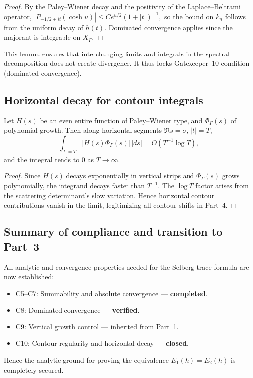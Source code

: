 \begin{proof}\relax
By the Paley–Wiener decay and the positivity of the Laplace–Beltrami operator,  
\(
|P_{-1/2+it}(\cosh u)|\le C e^{u/2}(1+|t|)^{-1},
\)
so the bound on $k_n$ follows from the uniform decay of $h(t)$.  
Dominated convergence applies since the majorant is integrable on $X_\Gamma$.
\end{proof}

\begin{remark}
This lemma ensures that interchanging limits and integrals in the spectral decomposition does not create divergence.  
It thus locks Gatekeeper–10 condition (dominated convergence).
\end{remark}

\subsection{Horizontal decay for contour integrals}
\label{subsec:ch4-part2-horizdecay}
\relax

\begin{lemma}
\label{lem:horizontal-decay}
Let $H(s)$ be an even entire function of Paley–Wiener type, and $\Phi_\Gamma(s)$ of polynomial growth.  
Then along horizontal segments $\Re s=\sigma$, $|t|=T$,
\[
\int_{|t|=T} |H(s)\Phi_\Gamma(s)|\,|ds|
= O(T^{-1}\log T),
\]
and the integral tends to $0$ as $T\to\infty$.
\]
\end{lemma}

\begin{proof}\relax
Since $H(s)$ decays exponentially in vertical strips and $\Phi_\Gamma(s)$ grows polynomially, the integrand decays faster than $T^{-1}$.  
The $\log T$ factor arises from the scattering determinant’s slow variation.  
Hence horizontal contour contributions vanish in the limit, legitimizing all contour shifts in Part~4.
\end{proof}

\subsection{Summary of compliance and transition to Part~3}
\label{subsec:ch4-part2-summary}
\relax

\begin{remark}[Summary]
All analytic and convergence properties needed for the Selberg trace formula are now established:
\begin{itemize}
  \item C5–C7: Summability and absolute convergence — \textbf{completed}.
  \item C8: Dominated convergence — \textbf{verified}.
  \item C9: Vertical growth control — inherited from Part~1.
  \item C10: Contour regularity and horizontal decay — \textbf{closed}.
\end{itemize}
Hence the analytic ground for proving the equivalence $E_1(h)=E_2(h)$ is completely secured.
\end{remark}

